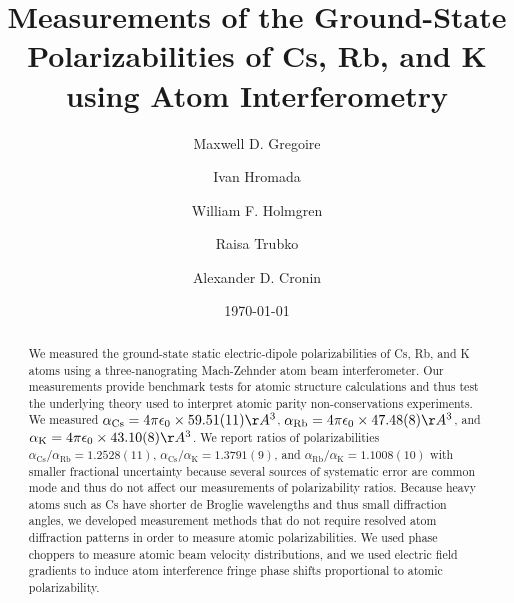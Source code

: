 \documentclass[twocolumn, prl,showpacs,superscriptaddress]{revtex4-1}   %
\newcommand{\ak}{\alpha_{\textrm{K}}}
\newcommand{\arb}{\alpha_{\textrm{Rb}}}
\newcommand{\acs}{\alpha_{\textrm{Cs}}}
\newcommand{\ratRbK}{1.1008(10)}
\newcommand{\ratCsK}{1.3791(9)}
\newcommand{\ratCsRb}{1.2528(11)}
\begin{document}
\title{Measurements of the Ground-State Polarizabilities of Cs, Rb, and K using Atom Interferometry}

\author{Maxwell D. Gregoire}
\author{Ivan Hromada}
\author{William F. Holmgren}
\author{Raisa Trubko}
\author{Alexander D. Cronin}

\date{\today}





\begin{abstract}
We measured the ground-state static electric-dipole polarizabilities of Cs, Rb, and K atoms using a three-nanograting Mach-Zehnder atom beam interferometer.  Our measurements provide benchmark tests for atomic structure calculations and thus test the underlying theory used to interpret atomic parity non-conservations experiments.  We measured $\acs = 4\pi\epsilon_0 \times 59.51(11) \AA^3$, $\arb = 4\pi\epsilon_0 \times 47.48(8) \AA^3$, and $\ak = 4\pi\epsilon_0 \times 43.10(8)\AA^3$.   We report ratios of polarizabilities $\acs/\arb = \ratCsRb$, $\acs/\ak = \ratCsK$, and $\arb/\ak = \ratRbK$ with smaller fractional uncertainty because several sources of systematic error are common mode and thus do not affect our measurements of polarizability ratios.  Because heavy atoms such as Cs have shorter de Broglie wavelengths and thus small diffraction angles, we developed measurement methods that do not require resolved atom diffraction patterns in order to measure atomic polarizabilities.  We used phase choppers to measure atomic beam velocity distributions, and we used electric field gradients to induce atom interference fringe phase shifts proportional to atomic polarizability.
\end{abstract}
\end{document}
